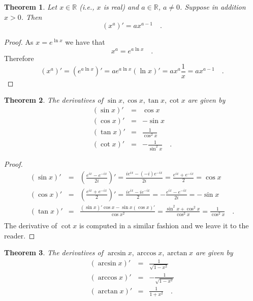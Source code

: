 \documentclass[12pt]{book}
\newtheorem{theorem}{Theorem}[section]
\renewcommand{\Arcsin}{\arcsin}
\renewcommand{\Arccos}{\arccos}
\renewcommand{\Arctan}{\arctan}
\begin{document}
\begin{theorem}
Let $x\in \mathbb R$ (i.e., $x$ is real) and $a\in \mathbb R$, $a\neq 0$. Suppose in addition $x>0$. Then
\begin{equation}\label{eqXtotheAthDerivative}
(x^a)'=ax^{a-1}\quad .
\end{equation}
\end{theorem}
\begin{proof} As $x=e^{\ln x}$ we have that
\[
x^a=  e^{a\ln x}\quad .
\]
Therefore
\[
(x^{a})'=(e^{a\ln x})'=ae^{a\ln x} (\ln x)' =a x^{a}\frac{1}{x} = ax^{a-1} \quad .
\]
\end{proof}
\begin{theorem}
The derivatives of $\sin x, \cos x, \tan x, \cot x$ are given by
\begin{equation}\boxed{
\begin{array}{rcl}
(\sin x)'&=&\displaystyle \cos x\\
(\cos x)'&=&-\sin x\\
(\tan x)'&=&\displaystyle \frac{1}{\cos ^2 x}\\
(\cot x)'&=&\displaystyle -\frac{1}{\sin ^2 x}\quad .
\end{array}
}
\end{equation}
\end{theorem}
\begin{proof}
\[
\begin{array}{rcl}
\displaystyle (\sin x)'&=&\displaystyle \left(\frac{ e^{ix}- e^{-ix}}{2i}\right)' =\frac{ie^{ix}- (-i)e^{-ix}}{2i} =\frac{e^{ix} +e^{-ix}}2=\cos x\\
\displaystyle(\cos x)' &=&\displaystyle \left(\frac{e^{ix} +e^{-ix}}{2}\right)' =\frac{ie^{ix}- ie^{-ix}}{2} = -\frac{e^{ix} -e^{-ix}}{2i}=-\sin x \\
\displaystyle (\tan x)' &=&\displaystyle  \frac{(\sin x)'\cos x- \sin x (\cos x)'}{ \cos x^{2}} = \frac{\sin^2x+ \cos^2x}{\cos^2x} =\frac{1}{\cos^2x} \quad .\\
\end{array}
\]
The derivative of $\cot x$ is computed in a similar fashion and we leave it to the reader.
\end{proof}
\begin{theorem}
The derivatives of $\Arcsin x, \Arccos x, \Arctan x$ are given by 
\[
\begin{array}{rcl}
(\Arcsin x)'&=&\displaystyle \frac{1}{\sqrt{1-x^2}} \\
(\Arccos x)'&=&\displaystyle -\frac{1}{\sqrt{1-x^2}}\\
(\Arctan x)'&=&\displaystyle \frac{1}{1+x^2}\quad .\\
\end{array}
\]
\end{theorem}
\end{document}
